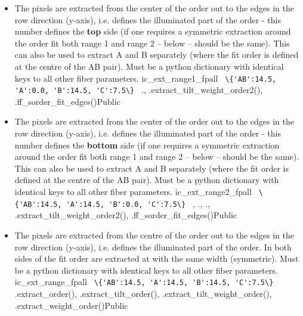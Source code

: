 \begin{itemize}
\item {}
{The pixels are extracted from the center of the order out to the edges in the row direction (y-axis), i.e. defines the illuminated part of the order - this number defines the \textbf{top} side (if one requires a symmetric extraction around the order fit both range 1 and range 2 -- below -- should be the same). This can also be used to extract A and B separately (where the fit order is defined at the centre of the AB pair). Must be a python dictionary with identical keys to all other fiber parameters.}
{ic\_ext\_range1\_fpall}
{\lstinline[style=pythoninline]| \{'AB':14.5, 'A':0.0, 'B':14.5, 'C':7.5\} |}
{\calFFraw}{\constantsfile}
{\calextractRAW.\progMAIN, \spirouEXTOR.extract\_tilt\_weight\_order2(), \spirouPlot.ff\_sorder\_fit\_edges()}{Public}

\item {}
{The pixels are extracted from the center of the order out to the edges in the row direction (y-axis), i.e. defines the illuminated part of the order - this number defines the \textbf{bottom} side (if one requires a symmetric extraction around the order fit both range 1 and range 2 -- below -- should be the same). This can also be used to extract A and B separately (where the fit order is defined at the centre of the AB pair). Must be a python dictionary with identical keys to all other fiber parameters.}
{ic\_ext\_range2\_fpall}
{\lstinline[style=pythoninline]| \{'AB':14.5, 'A':14.5, 'B':0.0, 'C':7.5\} |}
{\calFFraw, \calextractRAW}{\constantsfile}
{\calFFraw.\progMAIN, \calextractRAW.\progMAIN, \spirouEXTOR.extract\_tilt\_weight\_order2(), \spirouPlot.ff\_sorder\_fit\_edges()}{Public}

\item {}
{The pixels are extracted from the centre of the order out to the edges in the row direction (y-axis), i.e. defines the illuminated part of the order. In \calextractRAW both sides of the fit order are extracted at with the same width (symmetric). Must be a python dictionary with identical keys to all other fiber parameters.}
{ic\_ext\_range\_fpall}
{\lstinline[style=pythoninline]| \{'AB':14.5, 'A':14.5, 'B':14.5, 'C':7.5\} |}
{\calextractRAW}{\constantsfile}
{\spirouEXTOR.extract\_order(), \spirouEXTOR.extract\_tilt\_order(), \spirouEXTOR.extract\_tilt\_weight\_order(), \spirouEXTOR.extract\_weight\_order()}{Public}


\end{itemize}
